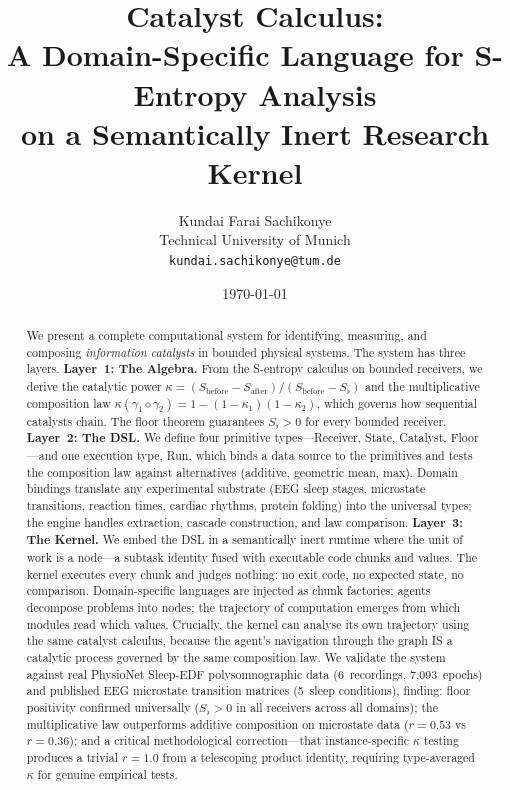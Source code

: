 \documentclass[11pt,a4paper]{article}
\title{\textbf{Catalyst Calculus:\\
A Domain-Specific Language for S-Entropy Analysis\\
on a Semantically Inert Research Kernel}}
\author{
Kundai Farai Sachikonye\\
\small Technical University of Munich\\
\small \texttt{kundai.sachikonye@tum.de}
}
\date{\today}
\theoremstyle{definition}
\theoremstyle{remark}
\newcommand{\Sfloor}{S_{\flat}}
\begin{document}
\maketitle

\begin{abstract}
\noindent
We present a complete computational system for identifying, measuring, and composing \emph{information catalysts} in bounded physical systems. The system has three layers. \textbf{Layer~1: The Algebra.} From the S-entropy calculus on bounded receivers, we derive the catalytic power $\kappa = (S_{\mathrm{before}} - S_{\mathrm{after}})/(S_{\mathrm{before}} - \Sfloor)$ and the multiplicative composition law $\kappa(\gamma_1 \diamond \gamma_2) = 1 - (1-\kappa_1)(1-\kappa_2)$, which governs how sequential catalysts chain. The floor theorem guarantees $\Sfloor > 0$ for every bounded receiver. \textbf{Layer~2: The DSL.} We define four primitive types---Receiver, State, Catalyst, Floor---and one execution type, Run, which binds a data source to the primitives and tests the composition law against alternatives (additive, geometric mean, max). Domain bindings translate any experimental substrate (EEG sleep stages, microstate transitions, reaction times, cardiac rhythms, protein folding) into the universal types; the engine handles extraction, cascade construction, and law comparison. \textbf{Layer~3: The Kernel.} We embed the DSL in a semantically inert runtime where the unit of work is a node---a subtask identity fused with executable code chunks and values. The kernel executes every chunk and judges nothing: no exit code, no expected state, no comparison. Domain-specific languages are injected as chunk factories; agents decompose problems into nodes; the trajectory of computation emerges from which modules read which values. Crucially, the kernel can analyse its own trajectory using the same catalyst calculus, because the agent's navigation through the graph IS a catalytic process governed by the same composition law. We validate the system against real PhysioNet Sleep-EDF polysomnographic data (6~recordings, 7{,}093~epochs) and published EEG microstate transition matrices (5~sleep conditions), finding: floor positivity confirmed universally ($\Sfloor > 0$ in all receivers across all domains); the multiplicative law outperforms additive composition on microstate data ($r = 0.53$ vs $r = 0.36$); and a critical methodological correction---that instance-specific $\kappa$ testing produces a trivial $r = 1.0$ from a telescoping product identity, requiring type-averaged $\kappa$ for genuine empirical tests.
\end{abstract}
\end{document}
